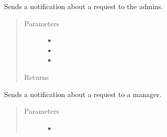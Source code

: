 \documentclass[letterpaper,10pt,english]{sphinxmanual}
\begin{document}
\begin{fulllineitems}
\begin{fulllineitems}
\end{fulllineitems}


\begin{fulllineitems}
\label{\detokenize{apidoc/utdesign_procurement:utdesign_procurement.emailer.EmailHandler.notifyRequestAdmin}}
Sends a notification about a request to the admins.
\begin{quote}\begin{description}
\item[{Parameters}] \leavevmode\begin{itemize}
\item {} 
 \textendash{} 

\item {} 
 \textendash{} 

\item {} 
 \textendash{} 

\end{itemize}

\item[{Returns}] \leavevmode


\end{description}\end{quote}

\end{fulllineitems}


\begin{fulllineitems}
\label{\detokenize{apidoc/utdesign_procurement:utdesign_procurement.emailer.EmailHandler.notifyRequestManager}}
Sends a notification about a request to a manager.
\begin{quote}\begin{description}
\item[{Parameters}] \leavevmode\begin{itemize}
\item {} 
 \textendash{} 


\end{itemize}
\end{description}
\end{quote}
\end{fulllineitems}
\end{fulllineitems}
\end{document}
